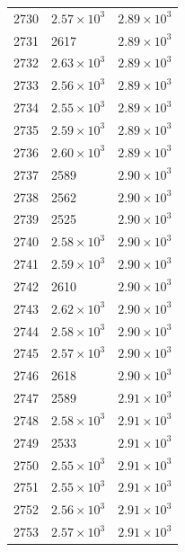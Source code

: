 \begin{table}[H]
\begin{tabular}{lll}
2730 & $\displaystyle 2.57 \times 10^{3}$ & $\displaystyle 2.89 \times 10^{3}$ \\
2731 & 2617 & $\displaystyle 2.89 \times 10^{3}$ \\
2732 & $\displaystyle 2.63 \times 10^{3}$ & $\displaystyle 2.89 \times 10^{3}$ \\
2733 & $\displaystyle 2.56 \times 10^{3}$ & $\displaystyle 2.89 \times 10^{3}$ \\
2734 & $\displaystyle 2.55 \times 10^{3}$ & $\displaystyle 2.89 \times 10^{3}$ \\
2735 & $\displaystyle 2.59 \times 10^{3}$ & $\displaystyle 2.89 \times 10^{3}$ \\
2736 & $\displaystyle 2.60 \times 10^{3}$ & $\displaystyle 2.89 \times 10^{3}$ \\
2737 & 2589 & $\displaystyle 2.90 \times 10^{3}$ \\
2738 & 2562 & $\displaystyle 2.90 \times 10^{3}$ \\
2739 & 2525 & $\displaystyle 2.90 \times 10^{3}$ \\
2740 & $\displaystyle 2.58 \times 10^{3}$ & $\displaystyle 2.90 \times 10^{3}$ \\
2741 & $\displaystyle 2.59 \times 10^{3}$ & $\displaystyle 2.90 \times 10^{3}$ \\
2742 & 2610 & $\displaystyle 2.90 \times 10^{3}$ \\
2743 & $\displaystyle 2.62 \times 10^{3}$ & $\displaystyle 2.90 \times 10^{3}$ \\
2744 & $\displaystyle 2.58 \times 10^{3}$ & $\displaystyle 2.90 \times 10^{3}$ \\
2745 & $\displaystyle 2.57 \times 10^{3}$ & $\displaystyle 2.90 \times 10^{3}$ \\
2746 & 2618 & $\displaystyle 2.90 \times 10^{3}$ \\
2747 & 2589 & $\displaystyle 2.91 \times 10^{3}$ \\
2748 & $\displaystyle 2.58 \times 10^{3}$ & $\displaystyle 2.91 \times 10^{3}$ \\
2749 & 2533 & $\displaystyle 2.91 \times 10^{3}$ \\
2750 & $\displaystyle 2.55 \times 10^{3}$ & $\displaystyle 2.91 \times 10^{3}$ \\
2751 & $\displaystyle 2.55 \times 10^{3}$ & $\displaystyle 2.91 \times 10^{3}$ \\
2752 & $\displaystyle 2.56 \times 10^{3}$ & $\displaystyle 2.91 \times 10^{3}$ \\
2753 & $\displaystyle 2.57 \times 10^{3}$ & $\displaystyle 2.91 \times 10^{3}$ \\

\end{tabular}
\end{table}

